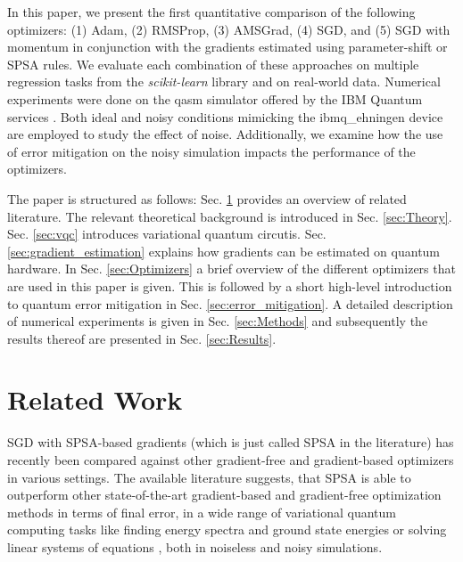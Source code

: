 In this paper, we present the first quantitative comparison of the following optimizers: (1) Adam, (2) RMSProp, (3) AMSGrad, (4) SGD, and (5) SGD with momentum in conjunction with the gradients estimated using parameter-shift or SPSA rules.
We evaluate each combination of these approaches on multiple regression tasks from the \textit{scikit-learn} library and on real-world data. Numerical experiments were done on the qasm simulator offered by the IBM Quantum services \cite{ibmq2022}. Both ideal and noisy conditions mimicking the ibmq\_ehningen device are employed to study the effect of noise. Additionally, we examine how the use of error mitigation \cite{Cai22} on the noisy simulation impacts the performance of the optimizers.

The paper is structured as follows: Sec. \ref{sec:related_work} provides an overview of related literature. The relevant theoretical background is introduced in Sec. \ref{sec:Theory}. Sec. \ref{sec:vqc} introduces variational quantum circutis. Sec. \ref{sec:gradient_estimation} explains how gradients can be estimated on quantum hardware. In Sec. \ref{sec:Optimizers} a brief overview of the different optimizers that are used in this paper is given. This is followed by a short high-level introduction to quantum error mitigation in Sec. \ref{sec:error_mitigation}. A detailed description of numerical experiments is given in Sec. \ref{sec:Methods} and subsequently the results thereof are presented in Sec. \ref{sec:Results}.

\section{Related Work}
\label{sec:related_work}
SGD with \gls{SPSA}-based gradients (which is just called \gls{SPSA} in the literature) has recently been compared against other gradient-free and gradient-based optimizers in various settings. The available literature suggests, that \gls{SPSA} is able to outperform other state-of-the-art gradient-based and gradient-free optimization methods in terms of final error, in a wide range of variational quantum computing tasks like finding energy spectra and ground state energies \cite{Sa2023, Bonet2021, Oliv2022, Mihalikova2022} or solving linear systems of equations \cite{Pellow-Jarman2021}, both in noiseless and noisy simulations.

